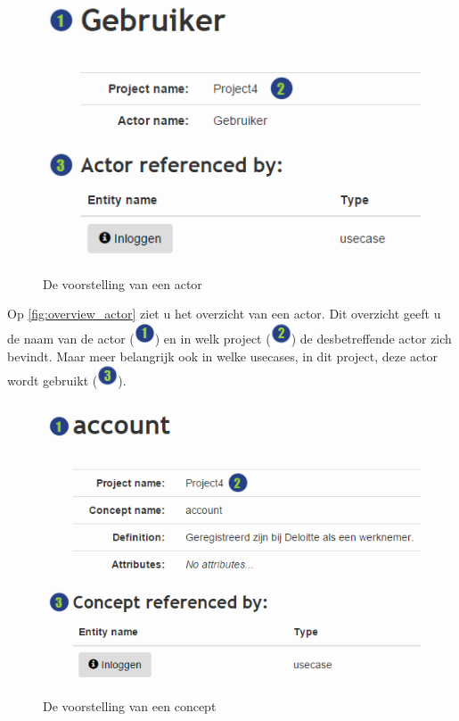 \documentclass[a4paper,11pt]{article}
\newcommand{\one}{\includegraphics[scale=0.5]{Gebruikershandleiding_img/1.png}}
\newcommand{\two}{\includegraphics[scale=0.5]{Gebruikershandleiding_img/2.png}}
\newcommand{\three}{\includegraphics[scale=0.5]{Gebruikershandleiding_img/3.png}}
\begin{document}
\begin{figure}[H]
\centering
\includegraphics[scale=0.5]{Gebruikershandleiding_img/show_actor.png}
\caption{De voorstelling van een actor}
\label{fig:overview_actor}
\end{figure}

Op \autoref{fig:overview_actor} ziet u het overzicht van een actor. Dit overzicht geeft u de naam van de actor (\one) en in welk project (\two) de desbetreffende actor zich bevindt. Maar meer belangrijk ook in welke usecases, in dit project, deze actor wordt gebruikt (\three).

\begin{figure}[H]
\centering
\includegraphics[scale=0.5]{Gebruikershandleiding_img/show_concept.png}
\caption{De voorstelling van een concept}
\label{fig:overview_concept}
\end{figure}
\end{document}
